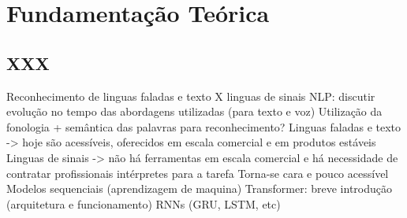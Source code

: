 \chapter{Fundamentação Teórica}

\section{XXX}
\label{xxx}

Reconhecimento de linguas faladas e texto X linguas de sinais
NLP: discutir evolução no tempo das abordagens utilizadas (para texto e voz) 
Utilização da fonologia + semântica das palavras para reconhecimento?
Linguas faladas e texto -> hoje são acessíveis, oferecidos em escala comercial e em produtos estáveis
Linguas de sinais -> não há ferramentas em escala comercial e há necessidade de contratar profissionais intérpretes para a tarefa
Torna-se cara e pouco acessível
Modelos sequenciais (aprendizagem de maquina)
Transformer: breve introdução (arquitetura e funcionamento)
RNNs (GRU, LSTM, etc)
